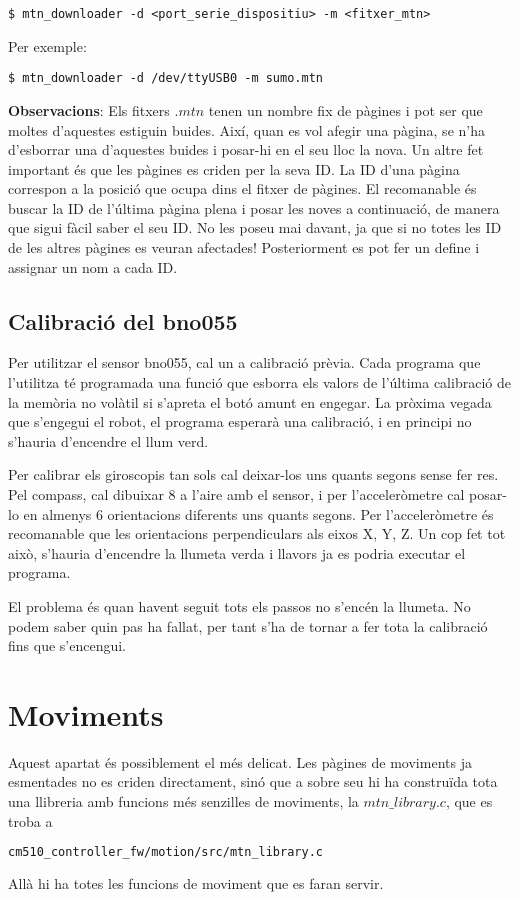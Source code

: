 \documentclass{article}
\begin{document}
\begin{lstlisting}
$ mtn_downloader -d <port_serie_dispositiu> -m <fitxer_mtn>
\end{lstlisting}
Per exemple:

\begin{lstlisting}
$ mtn_downloader -d /dev/ttyUSB0 -m sumo.mtn
\end{lstlisting}

\textbf{Observacions}: Els fitxers $.mtn$ tenen un nombre fix de pàgines i pot ser que moltes d'aquestes estiguin buides. Així, quan es vol afegir una pàgina, se n'ha d'esborrar una d'aquestes buides i posar-hi en el seu lloc la nova. Un altre fet important és que les pàgines es criden per la seva ID. La ID d'una pàgina correspon a la posició que ocupa dins el fitxer de pàgines. El recomanable és buscar la ID de l'última pàgina plena i posar les noves a continuació, de manera que sigui fàcil saber el seu ID. No les poseu mai davant, ja que si no totes les ID de les altres pàgines es veuran afectades! Posteriorment es pot fer un define i assignar un nom a cada ID.

\subsection{Calibració del bno055}
Per utilitzar el sensor bno055, cal un a calibració prèvia. Cada programa que l'utilitza té programada una funció que esborra els valors de l'última calibració de la memòria no volàtil si s'apreta el botó amunt en engegar. La pròxima vegada que s'engegui el robot, el programa esperarà una calibració, i en principi no s'hauria d'encendre el llum verd. 

Per calibrar els giroscopis tan sols cal deixar-los uns quants segons sense fer res. Pel compass, cal dibuixar 8 a l'aire amb el sensor, i per l'acceleròmetre cal posar-lo en almenys 6 orientacions diferents uns quants segons. Per l'acceleròmetre és recomanable que les orientacions perpendiculars als eixos X, Y, Z. Un cop fet tot això, s'hauria d'encendre la llumeta verda i llavors ja es podria executar el programa.

El problema és quan havent seguit tots els passos no s'encén la llumeta. No podem saber quin pas ha fallat, per tant s'ha de tornar a fer tota la calibració fins que s'encengui.

\section{Moviments}
Aquest apartat és possiblement el més delicat. Les pàgines de moviments ja esmentades no es criden directament, sinó que a sobre seu hi ha construïda tota una llibreria amb funcions més senzilles de moviments, la $mtn\_library.c$, que es troba a 
\begin{lstlisting}[language=bash]
cm510_controller_fw/motion/src/mtn_library.c
\end{lstlisting}
Allà hi ha totes les funcions de moviment que es faran servir. 
\end{document}
